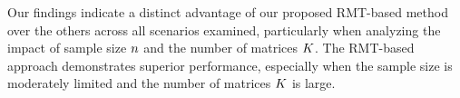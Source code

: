 \documentclass{article}
\theoremstyle{plain}
\theoremstyle{definition}
\theoremstyle{remark}
\begin{document}
Our findings indicate a distinct advantage of our proposed RMT-based method over the others across all scenarios examined, particularly when analyzing the impact of sample size $n$ and the number of matrices $K$. The RMT-based approach demonstrates superior performance, especially when the sample size is moderately limited and the number of matrices  $K$ is large.%






%     
%     
%     
%     
%     
  
\end{document}
